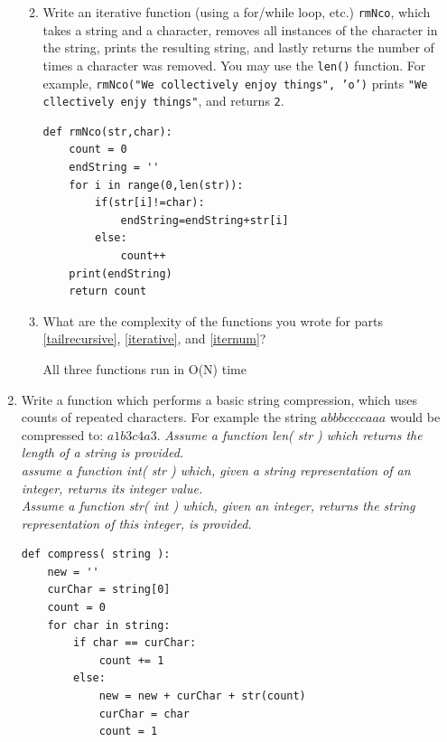 \documentclass[11pt]{article}
\newenvironment{answer}{\large\lstset{basicstyle=\large}\color{white}}{}
\newenvironment{answer}{\large\lstset{basicstyle=\large}\color{red}}{}
\begin{document}
\begin{enumerate}
\begin{enumerate}
\newpage


\item
\label{iternum}
Write an iterative function (using a for/while loop, etc.) \texttt{rmNco}, which takes a string and a character, removes all instances of the character in the string, prints the resulting string, and lastly returns the number of times a character was removed.
You may use the \texttt{len()} function.
For example, \texttt{rmNco("We collectively enjoy things", 'o')} prints \texttt{"We cllectively enjy things"}, and returns \texttt{2}.
\begin{answer}
\begin{lstlisting}
def rmNco(str,char):
    count = 0
    endString = ''
    for i in range(0,len(str)):
        if(str[i]!=char):
            endString=endString+str[i]
        else:
            count++
    print(endString)
    return count
\end{lstlisting}
\end{answer}

\item
What are the complexity of the functions you wrote for parts \ref{tailrecursive}, \ref{iterative}, and \ref{iternum}?
\begin{answer}

All three functions run in O(N) time \\
\end{answer}
\end{enumerate}

\item Write a function which performs a basic string compression, which uses counts of repeated characters. For example 
the string $abbbccccaaa$ would be compressed to: $a1b3c4a3$. 
 \emph{Assume a function len( str ) which returns the length of a string is provided. \\
      assume a function int( str ) which, given a string representation of an integer, returns its integer value. \\
      Assume a function str( int ) which, given an integer, returns the string representation of this integer, is provided. }

\begin{answer}
\begin{lstlisting}
def compress( string ):
    new = ''
    curChar = string[0]
    count = 0
    for char in string:
        if char == curChar:
            count += 1
        else:
            new = new + curChar + str(count)
            curChar = char
            count = 1 


\end{lstlisting}
\end{answer}
\end{enumerate}
\end{document}
